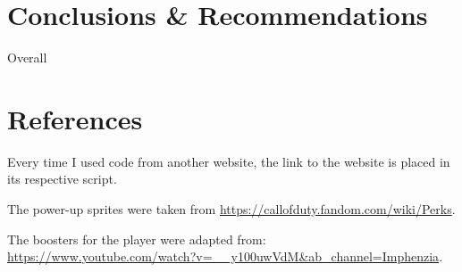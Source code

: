 \documentclass{article}
\begin{document}
\section{Conclusions \& Recommendations}
Overall

\section{References}
Every time I used code from another website, the link to the website is placed in its respective script.

The power-up sprites were taken from \url{https://callofduty.fandom.com/wiki/Perks}.

The boosters for the player were adapted from: \url{https://www.youtube.com/watch?v=__y100uwVdM&ab_channel=Imphenzia}.


% 
% 
\end{document}
